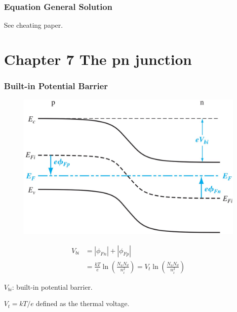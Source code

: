 \documentclass{beamer}
\begin{document}
    \begin{frame} \frametitle{Equation General Solution}
        \par See cheating paper.
    \end{frame}

\section{Chapter 7 The pn junction}
    \begin{frame}[t] \frametitle{Built-in Potential Barrier}
        \begin{figure}[H]
            \centering
            \includegraphics[width=0.5\linewidth]{pn-junction-energy-band-diagram.jpg}
            \label{fig:pn-junction-energy-band-diagram-2.jpg}
        \end{figure}
        \begin{equation*}
            \boxed{
                \begin{aligned}
                    V_{bi} &= |\phi_{Fn}| + |\phi_{Fp}| \\
                    &= \frac{kT}{e} \ln \left( \frac{N_a N_d}{n_i^2}  \right) = V_t \ln\left( \frac{N_a N_d}{n_i^2}  \right)
                \end{aligned}
            }
        \end{equation*}
        \par $V_{bi}$: built-in potential barrier.
        \par $V_t = kT / e$ defined as the thermal voltage.
    \end{frame}
\end{document}
